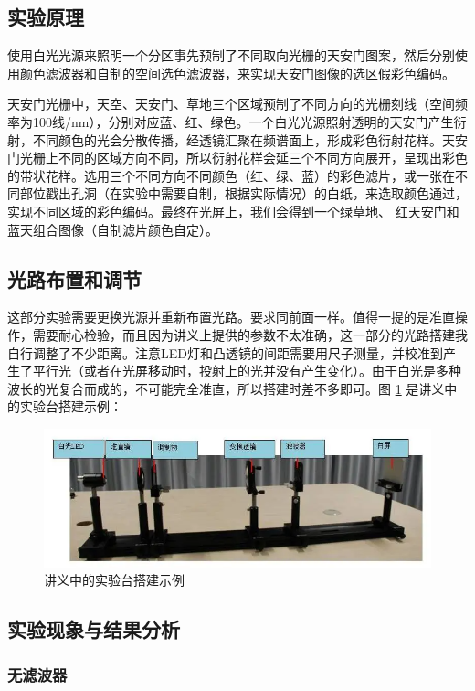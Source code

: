 \documentclass[UTF8]{article}
\theoremstyle{MyLineTheoremStyle} %
\theoremstyle{MyBlockTheoremStyle} %
\theoremstyle{MySubsubsectionStyle} %
\begin{document}
\subsection{实验原理}

使用白光光源来照明一个分区事先预制了不同取向光栅的天安门图案，然后分别使用颜色滤波器和自制的空间选色滤波器，来实现天安门图像的选区假彩色编码。

天安门光栅中，天空、天安门、草地三个区域预制了不同方向的光栅刻线（空间频率为100线/nm），分别对应蓝、红、绿色。一个白光光源照射透明的天安门产生衍射，不同颜色的光会分散传播，经透镜汇聚在频谱面上，形成彩色衍射花样。天安门光栅上不同的区域方向不同，所以衍射花样会延三个不同方向展开，呈现出彩色的带状花样。选用三个不同方向不同颜色（红、绿、蓝）的彩色滤片，或一张在不同部位戳出孔洞（在实验中需要自制，根据实际情况）的白纸，来选取颜色通过，实现不同区域的彩色编码。最终在光屏上，我们会得到一个绿草地、
红天安门和蓝天组合图像（自制滤片颜色自定）。



\subsection{光路布置和调节}

这部分实验需要更换光源并重新布置光路。要求同前面一样。值得一提的是准直操作，需要耐心检验，而且因为讲义上提供的参数不太准确，这一部分的光路搭建我自行调整了不少距离。注意LED灯和凸透镜的间距需要用尺子测量，并校准到产生了平行光（或者在光屏移动时，投射上的光并没有产生变化）。由于白光是多种波长的光复合而成的，不可能完全准直，所以搭建时差不多即可。图 \ref{假彩示意} 是讲义中的实验台搭建示例：
\begin{figure}[H]\centering
    \includegraphics[width=0.8\columnwidth]{assets/3 假彩编码/讲义图.png}
    \caption{讲义中的实验台搭建示例}
    \label{假彩示意}
\end{figure}

\subsection{实验现象与结果分析}

\subsubsection{无滤波器}
\end{document}
